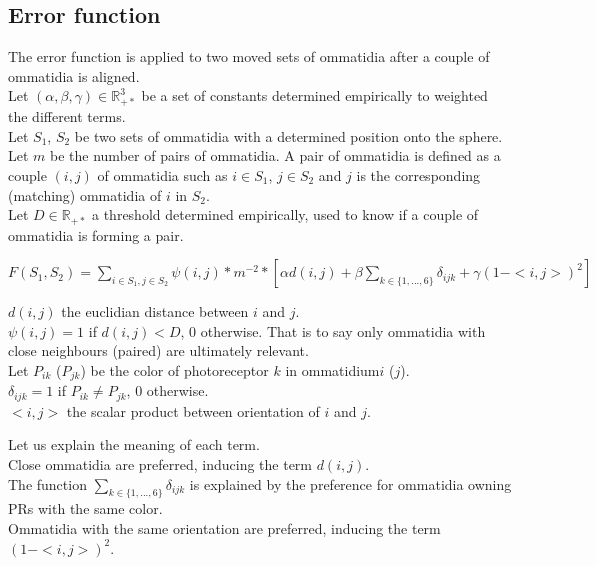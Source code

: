 \documentclass{article}
\begin{document}
\subsection{Error function}
The error function is applied to two moved sets of ommatidia after a couple of ommatidia is aligned.\\
		Let $\displaystyle (\alpha, \beta, \gamma) \in \mathbb{R}_{+*}^3$ be a set of constants determined empirically to weighted the different terms.\\
		Let $ S_{1} $, $ S_{2} $ be two sets of ommatidia with a determined position onto the sphere.\\
		Let $m$ be the number of pairs of ommatidia. A pair of ommatidia is defined as a couple $(i,j)$ of ommatidia such as $i \in S_{1}$, $j \in S_{2}$ and $j$ is the corresponding (matching) ommatidia of $i$ in $ S_{2} $. 
		\\
		Let $D\in \mathbb{R}_{+*}$ a threshold determined empirically, used to know if a couple of ommatidia is forming a pair.
	\begin{center}
       $\displaystyle F(S_{1},S_{2})=\sum_{i \in S_{1}, j \in S_{2}} \psi(i,j)*m^{-2}*\left[\alpha d(i,j)+\beta \sum_{k\in\lbrace1,...,6\rbrace}\delta_{ijk}+\gamma (1-<i,j>)^2 \right] $
     \end{center}
     \begin{center}
     	$\displaystyle d(i,j)$ the euclidian distance between $i$ and $j$.
     	\\ $\psi(i,j)=1$ if $\displaystyle d(i,j)<D$, $0$ otherwise. That is to say only ommatidia with close neighbours (paired) are ultimately relevant.
       \\ Let $P_{ik}$ ($P_{jk}$) be the color of photoreceptor $k$ in ommatidium$i$ ($j$).
       \\$\displaystyle \delta_{ijk}=1 $ if $P_{ik} \neq P_{jk}$, $0$ otherwise.
       \\$\displaystyle <i,j>$ the scalar product between orientation of $i$ and $j$.
	\end{center}
Let us explain the meaning of each term.\\
Close ommatidia are preferred, inducing the term $ d(i,j) $.
\\
The function $ \sum_{k\in\lbrace1,...,6\rbrace}\delta_{ijk}  $ is explained by the preference for ommatidia owning PRs with the same color.
 \\
Ommatidia with the same orientation are preferred, inducing the term $ (1-<i,j>)^2 $.
\\
\end{document}
